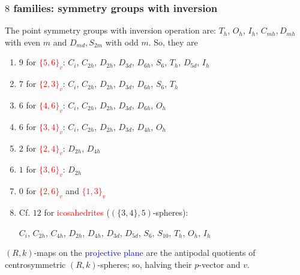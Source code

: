 \documentclass{beamer}
\begin{document}
\begin{frame}\frametitle{$8$ families: symmetry  groups with inversion}
\vspace{-1mm}
The point symmetry groups with  inversion operation are:
$T_h$, $O_h$, $I_h$,
$C_{mh},D_{mh}$ with even $m$ and $D_{md},S_{2m}$ with odd $m$. So, they are
\begin{enumerate}
\item
$9$ for \textcolor{red}{$\{5,6\}_v$}:
$C_i$, $C_{2h}$, $D_{2h}$, $D_{3d}$, $D_{6h}$, $S_6$, $T_h$, $D_{5d}$, $I_h$
\item
$7$ for \textcolor{red}{$\{2, 3\}_v$}:  $C_i$, $C_{2h}$,
  $D_{2h}$, $D_{3d}$, $D_{6h}$,  $S_6$, $T_h$
\item
$6$ for \textcolor{red}{$\{4,6\}_v$}:
$C_{i}$, $C_{2h}$, $D_{2h}$, $D_{3d}$, $D_{6h}$, $O_h$  
\item
$6$ for \textcolor{red}{$\{3, 4\}_v$}:
$C_i$, $C_{2h}$, $D_{2h}$, $D_{3d}$, $D_{4h}$,  $O_h$
\item
$2$ for \textcolor{red}{$\{2, 4\}_v$}: $D_{2h}$, $D_{4h}$
\item
$1$ for \textcolor{red}{$\{3,6\}_v$}: $D_{2h}$

\item
$0$ for  \textcolor{red}{$\{2, 6\}_v$} and \textcolor{red}{$\{1, 
3\}_v$}

\item
 Cf. $12$ for \textcolor{red}{icosahedrites} ($(\{3,4\},5)$-spheres):

$C_i$, $C_{2h}$, $C_{4h}$, $D_{2h}$, $D_{4h}$, $D_{3d}$, $D_{5d}$, $S_6$, $S_{10}$, $T_h$, $O_{h}$, 
$I_h$

\end{enumerate}   
\vspace{2mm}

$(R,k)$-maps on the \textcolor{blue}{projective plane} are
 the antipodal quotients of  centrosymmetric $(R,k)$-spheres; so, halving their
$p$-vector and $v$.

\end{frame}
\end{document}
